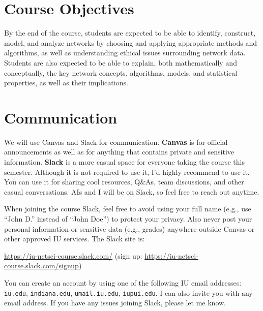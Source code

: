 \documentclass[11pt,article,oneside]{memoir} %
\begin{document}
\section{Course Objectives} %

By the end of the course, students are expected to be able to identify, construct, model, and analyze networks by choosing and applying appropriate methods and algorithms, as well as understanding ethical issues surrounding network data.
Students are also expected to be able to explain, both mathematically and conceptually, the key network concepts, algorithms, models, and statistical properties, as well as their implications.
\section{Communication} %

We will use Canvas and Slack for communication. \textbf{Canvas} is for official announcements as well as for anything that contains private and sensitive information. \textbf{Slack} is a more casual space for everyone taking the course this semester. Although it is not required to use it, I'd highly recommend to use it. You can use it for sharing cool resources, Q\&As, team discussions, and other casual conversations. AIs and I will be on Slack, so feel free to reach out anytime. 

When joining the course Slack, feel free to avoid using your full name (e.g., use ``John D.'' instead of ``John Doe'') to protect your privacy. 
Also never post your personal information or sensitive data (e.g., grades) anywhere outside Canvas or other approved IU services. 
The Slack site is:

\url{https://iu-netsci-course.slack.com/} (sign up: \url{https://iu-netsci-course.slack.com/signup})

You can create an account by using one of the following IU email addresses: \texttt{iu.edu}, \texttt{indiana.edu}, \texttt{umail.iu.edu}, \texttt{iupui.edu}.
I can also invite you with any email address. 
If you have any issues joining Slack, please let me know.
\end{document}
